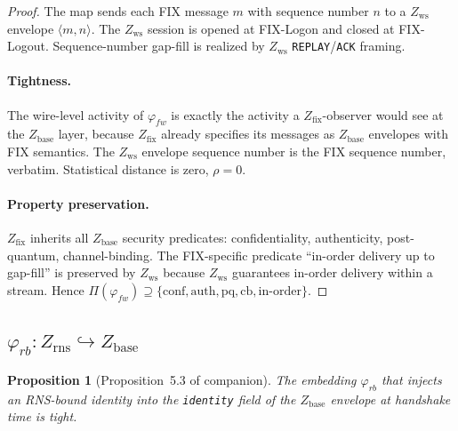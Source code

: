 \documentclass[11pt]{article}
\newtheorem{proposition}[theorem]{Proposition}
\theoremstyle{definition}
\theoremstyle{remark}
\newcommand{\Zb}{Z_{\mathrm{base}}}
\newcommand{\Zw}{Z_{\mathrm{ws}}}
\newcommand{\Zf}{Z_{\mathrm{fix}}}
\newcommand{\Zr}{Z_{\mathrm{rns}}}
\begin{document}
\begin{proof}
The map sends each FIX message $m$ with sequence number $n$ to a
$\Zw$ envelope $\langle m, n \rangle$. The $\Zw$ session is opened
at FIX-Logon and closed at FIX-Logout. Sequence-number gap-fill is
realized by $\Zw$ \texttt{REPLAY}/\texttt{ACK} framing.

\paragraph{Tightness.}
The wire-level activity of $\varphi_{fw}$ is exactly the activity a
$\Zf$-observer would see at the $\Zb$ layer, because $\Zf$ already
specifies its messages as $\Zb$ envelopes with FIX semantics. The
$\Zw$ envelope sequence number is the FIX sequence number,
verbatim. Statistical distance is zero, $\rho = 0$.

\paragraph{Property preservation.}
$\Zf$ inherits all $\Zb$ security predicates: confidentiality,
authenticity, post-quantum, channel-binding. The FIX-specific
predicate ``in-order delivery up to gap-fill'' is preserved by
$\Zw$ because $\Zw$ guarantees in-order delivery within a stream.
Hence $\Pi(\varphi_{fw}) \supseteq \{\mathrm{conf}, \mathrm{auth},
\mathrm{pq}, \mathrm{cb}, \mathrm{in\text{-}order}\}$.
\end{proof}

\subsection{$\varphi_{rb} : \Zr \hookrightarrow \Zb$}

\begin{proposition}[Proposition~5.3 of companion]
\label{prop:rb-proof}
The embedding $\varphi_{rb}$ that injects an RNS-bound identity into
the \texttt{identity} field of the $\Zb$ envelope at handshake time
is tight.
\end{proposition}
\end{document}
